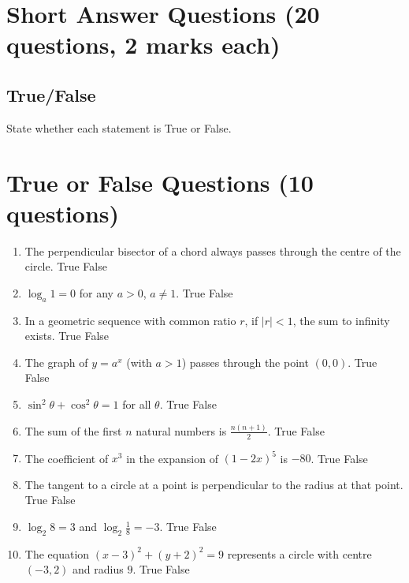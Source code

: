 \documentclass{../Templates/sbs-exam}
\begin{document}
\section*{Short Answer Questions (20 questions, 2 marks each)}

\subsection*{True/False}
State whether each statement is True or False.

\section*{True or False Questions (10 questions)}
\begin{enumerate}
    \item The perpendicular bisector of a chord always passes through the centre of the circle. \hfill True \quad False
    
    \item $\log_a 1 = 0$ for any $a>0$, $a\neq 1$. \hfill True \quad False
    
    \item In a geometric sequence with common ratio $r$, if $|r|<1$, the sum to infinity exists. \hfill True \quad False
    
    \item The graph of $y = a^x$ (with $a>1$) passes through the point $(0,0)$. \hfill True \quad False
    
    \item $\sin^2\theta + \cos^2\theta = 1$ for all $\theta$. \hfill True \quad False
    
    \item The sum of the first $n$ natural numbers is $\frac{n(n+1)}{2}$. \hfill True \quad False
    
    \item The coefficient of $x^3$ in the expansion of $(1-2x)^5$ is $-80$. \hfill True \quad False
    
    \item The tangent to a circle at a point is perpendicular to the radius at that point. \hfill True \quad False
    
    \item $\log_2 8 = 3$ and $\log_2 \frac{1}{8} = -3$. \hfill True \quad False
    
    \item The equation $(x-3)^2 + (y+2)^2 = 9$ represents a circle with centre $(-3,2)$ and radius $9$. \hfill True \quad False
\end{enumerate}
\end{document}
